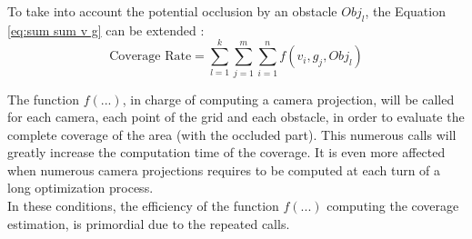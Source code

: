 To take into account the potential occlusion by an obstacle $Obj_l$, the Equation \ref{eq:sum sum v g} can be extended : 
	\begin{equation}
		 \mbox{Coverage Rate}=\sum_{l=1}^{k}\sum_{j=1}^{m}\sum_{i=1}^{n}f( v_i,g_j,Obj_l)
	\end{equation} 
 
The function $f(...)$, in charge of computing a camera projection, will be called for each camera, each point of the grid and each obstacle, in order to evaluate the complete coverage of the area (with the occluded part). This numerous calls will greatly increase the computation time of the coverage. It is even more affected when numerous camera projections requires to be computed at each turn of a long optimization process.\\
In these conditions, the efficiency of the function $f(...)$ computing the coverage estimation, is primordial due to the repeated calls. 
